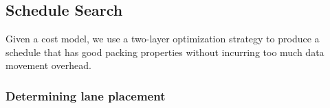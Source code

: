 \subsection{Schedule Search}\label{sec:schedule-search}
Given a cost model, we use a two-layer optimization strategy to produce a schedule that has good packing properties without incurring too much data movement overhead.
\subsubsection*{Determining lane placement}
    

    
